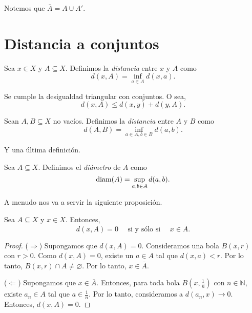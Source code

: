 \begin{center}
	
\end{center}

\begin{remark}
	Notemos que $\overline{A} = A \cup A'$.
\end{remark}


\section{Distancia a conjuntos}

\begin{definition}
	Sea $x \in X$ y $A \subseteq X$. Definimos la \emph{distancia} entre $x$ y $A$ como
	$$
		d(x, A) = \inf_{a \in A} d(x, a).
	$$
\end{definition}

\begin{remark}
	Se cumple la desigualdad triangular con conjuntos. O sea,
	$$
		d(x, A) \leq d(x, y) + d(y, A).
	$$
\end{remark}

\begin{definition}
	Sean $A, B \subseteq X$ no vacíos. Definimos la \emph{distancia} entre $A$ y $B$ como
	$$
		d(A, B) = \inf_{a \in A, b \in B} d(a, b).
	$$
\end{definition}

Y una última definición.

\begin{definition}
	Sea $A \subseteq X$. Definimos el \emph{diámetro} de $A$ como
	$$
		\operatorname{diam}(A) = \sup_{a, b \in A} d(a, b).
	$$
\end{definition}

A menudo nos va a servir la siguiente proposición.

\begin{proposition}
	Sea $A \subseteq X$ y $x \in X$. Entonces,
	\begin{equation*}
		d(x, A) = 0 \quad \text{ si y sólo si } \quad x \in \overline{A}.
	\end{equation*}
\end{proposition}

\begin{proof}
	($\Rightarrow$) Supongamos que $d(x, A) = 0$. Consideramos una bola $B(x, r)$ con $r > 0$. Como $d(x, A) = 0$, existe un $a \in A$ tal que $d(x, a) < r$. Por lo tanto, $B(x, r) \cap A \neq \varnothing$. Por lo tanto, $x \in \overline{A}$.

	($\Leftarrow$) Supongamos que $x \in \overline{A}$. Entonces, para toda bola $B(x, \frac{1}{n})$ con $n \in \mathbb{N}$, existe $a_n \in A$ tal que $a \in \frac{1}{n}$. Por lo tanto, consideramos a $d(a_n, x) \longrightarrow 0$. Entonces, $d(x, A) =0$.
\end{proof}


